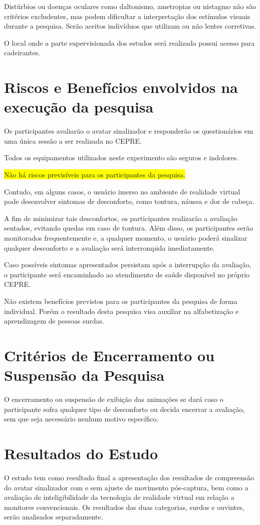 \documentclass[a4paper,11pt,titlepage,singlespacing]{article}
\begin{document}
Distúrbios ou doenças oculares como daltonismo, ametropias ou nistagmo não são critérios excludentes, mas podem dificultar a interpretação dos estímulos visuais durante a pesquisa. Serão aceitos indivíduos que utilizam ou não lentes corretivas. 

O local onde a parte supervisionada dos estudos será realizada possui acesso para cadeirantes.

\section{Riscos e Benefícios envolvidos na execução da pesquisa}
Os participantes avaliarão o avatar sinalizador e responderão os questionários em uma única sessão a ser realizada no CEPRE.

Todos os equipamentos utilizados neste experimento são seguros e indolores. 

\colorbox{yellow}{Não há riscos previsíveis para os participantes da pesquisa.} 

Contudo, em alguns casos, o usuário imerso no ambiente de realidade virtual pode desenvolver sintomas de desconforto, como tontura, náusea e dor de cabeça. 

A fim de minimizar tais desconfortos, os participantes realizarão a avaliação sentados, evitando quedas em caso de tontura. Além disso, os participantes serão monitorados frequentemente e, a qualquer momento, o usuário poderá sinalizar qualquer desconforto e a avaliação será interrompida imediatamente. 

Caso possíveis sintomas apresentados persistam após a interrupção da avaliação, o participante será encaminhado ao atendimento de saúde disponível no próprio CEPRE.


Não existem benefícios previstos para os participantes da pesquisa de forma individual. Porém o resultado desta pesquisa visa auxiliar na alfabetização e aprendizagem de pessoas surdas.

\section{Critérios de Encerramento ou Suspensão da Pesquisa}
O encerramento ou suspensão de exibição das animações se dará caso o participante sofra qualquer tipo de desconforto ou decida encerrar a avaliação, sem que seja necessário nenhum motivo específico. 

\section{Resultados do Estudo}
O estudo tem como resultado final a apresentação dos resultados de compreensão do avatar sinalizador com e sem ajuste de movimento pós-captura, bem como a avaliação de inteligibilidade da tecnologia de realidade virtual em relação a monitores convencionais. Os resultados das duas categorias, surdos e ouvintes, serão analisados separadamente.
\end{document}
